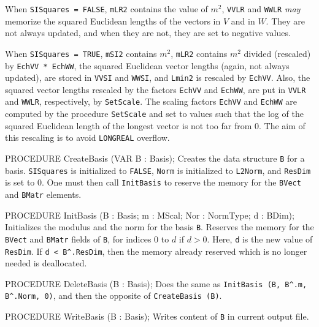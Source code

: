    When {\tt SISquares = FALSE}, {\tt mLR2} contains the value of $m^2$,
   {\tt VVLR} and {\tt WWLR} {\em may\/} memorize the squared Euclidean 
   lengths of the vectors in $V$ and in $W$. 
   They are not always updated, and when they are not, they
   are set to negative values.

   When {\tt SISquares = TRUE}, {\tt mSI2} contains $m^2$,
   {\tt mLR2} contains $m^2$ divided (rescaled) by {\tt EchVV * EchWW},
   the squared Euclidean vector lengths (again, not always updated),
   are stored in {\tt VVSI} and {\tt WWSI}, and 
   {\tt Lmin2} is rescaled by {\tt EchVV}.
   Also, the squared vector lengths rescaled by the factors
   {\tt EchVV} and {\tt EchWW}, are put in {\tt VVLR} and {\tt WWLR},
   respectively, by {\tt SetScale}.
   The scaling factors {\tt EchVV} and {\tt EchWW} are computed
   by the procedure {\tt SetScale} and set to values such that
   the log of the squared Euclidean length of the longest vector is 
   not too far from 0.  
   The aim of this rescaling is to avoid {\tt LONGREAL} overflow.
   \endtabb
\code

PROCEDURE CreateBasis (VAR B : Basis);
\endcode
 \tab Creates the data structure {\tt B} for a basis. 
    {\tt SISquares} is initialized to {\tt FALSE},
    {\tt Norm\/} is initialized to {\tt L2Norm},
    and {\tt ResDim} is set to 0.
    One must then call {\tt InitBasis} to reserve the memory for
    the {\tt BVect} and {\tt BMatr} elements.
 \endtab
\code

PROCEDURE InitBasis (B : Basis;  m : MScal;  Nor : NormType;  d : BDim);
\endcode
   \tab
    Initializes the modulus and the norm for the basis {\tt B}.  
    Reserves the memory for the {\tt BVect} and {\tt BMatr}
    fields of {\tt B}, for indices 0 to $d$ if $d>0$.
    Here, {\tt d} is the new value of {\tt ResDim}.
    If {\tt d < B\^{}.ResDim}, then the memory already reserved which
    is no longer needed is deallocated.
    \endtab
\code

PROCEDURE DeleteBasis (B : Basis);
\endcode
   \tab  Does the same as {\tt InitBasis (B, B\^{}.m, B\^{}.Norm, 0)}, 
    and then the  opposite of {\tt CreateBasis (B)}.
   \endtab
\code

PROCEDURE WriteBasis (B : Basis);
\endcode
  \tab  Writes content of {\tt B} in current output file.
  \endtab
\code

